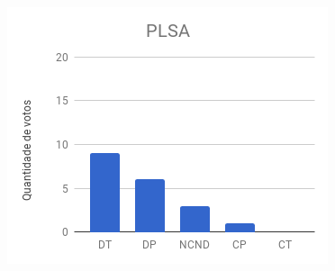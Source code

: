 \begin{figure}[!h]
		\includegraphics[width=.31\textwidth]{images/figuras-experimento/C2-Q1-PLSA.png}

\end{figure}




\begin{figure}[!h] \centering     %


\end{figure}
